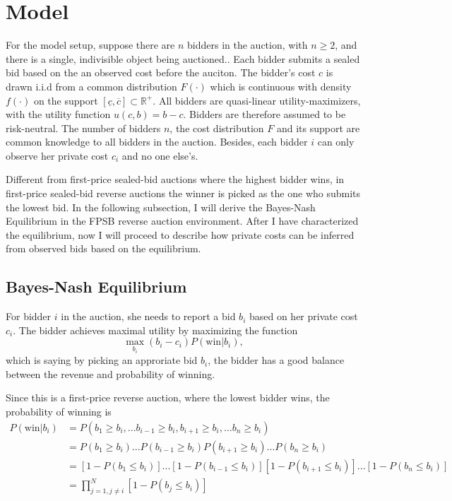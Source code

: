 \documentclass[11pt]{article}
\begin{document}
\section{Model}

For the model setup, suppose there are $n$ bidders in the auction, with 
$n \geq 2$, and 
there is a single, indivisible object being auctioned.. Each bidder submits 
a sealed bid based on the an observed cost before the auciton. The 
bidder's cost $c$ is drawn i.i.d from a common distribution $F(\cdot)$ which is 
continuous with density $f(\cdot)$ on the support $[\underline{c}, \overline{c}] \subset \mathbb{R}^{+}$. 
All bidders are quasi-linear utility-maximizers, with the utility function 
$u(c, b) = b - c$. Bidders are therefore assumed to be risk-neutral. 
The number of bidders $n$, the cost distribution $F$ and its support are common 
knowledge to all bidders in the auction. Besides, each bidder $i$ can only observe her 
private cost $c_i$ and no one else's. 

Different from first-price sealed-bid auctions where 
the highest bidder wins, in first-price sealed-bid reverse 
auctions the winner is picked as the one who submits the 
lowest bid. In the following subsection, I will derive the 
Bayes-Nash Equilibrium in the FPSB reverse auction environment.
After I have characterized the equilibrium, now I will proceed to describe how 
private costs can be inferred from observed bids based on the equilibrium. 

\subsection{Bayes-Nash Equilibrium}
For bidder $i$ in the auction, she needs to report a bid $b_i$ based on 
her private cost $c_i$. The bidder achieves maximal utility 
by maximizing the function 
$$ \max_{b_i} (b_i - c_i)P(\text{win}|b_i), $$ 
which is saying by picking an approriate bid $b_i$, the bidder 
has a good balance between the revenue and probability of winning. 

Since this is a first-price reverse auction, where the lowest bidder wins, 
the probability of winning is 
\begin{align*}
    P(\text{win}|b_i) &= P(b_1 \geq b_i, ... b_{i-1} \geq b_i, b_{i+1} \geq b_i, ... b_n \geq b_i) \\
        &= P(b_1 \geq b_i) ... P(b_{i-1} \geq b_i) P(b_{i+1} \geq b_i) ... P(b_n \geq b_i) \\
        &= [1-P(b_1 \leq b_i)] ... [1-P(b_{i-1} \leq b_i)][1-P(b_{i+1} \leq b_i)] ... [1-P(b_n \leq b_i)] \\
        &= \prod_{j=1, j \neq i}^{N}[1-P(b_j \leq b_i)]
\end{align*}
\end{document}
